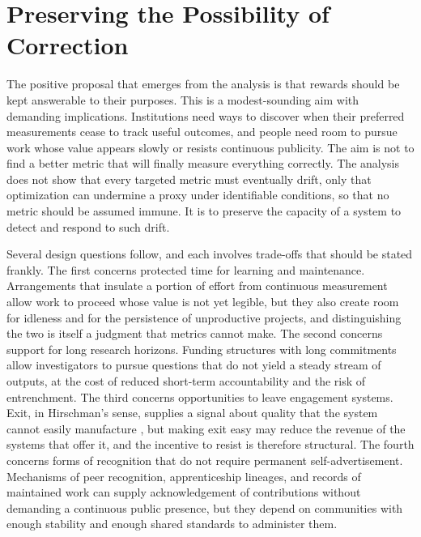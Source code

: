 \documentclass[11pt]{article}
\theoremstyle{definition}
\theoremstyle{remark}
\begin{document}
\section{Preserving the Possibility of Correction}

The positive proposal that emerges from the analysis is that rewards should be kept answerable to their purposes. This is a modest-sounding aim with demanding implications. Institutions need ways to discover when their preferred measurements cease to track useful outcomes, and people need room to pursue work whose value appears slowly or resists continuous publicity. The aim is not to find a better metric that will finally measure everything correctly. The analysis does not show that every targeted metric must eventually drift, only that optimization can undermine a proxy under identifiable conditions, so that no metric should be assumed immune. It is to preserve the capacity of a system to detect and respond to such drift.

Several design questions follow, and each involves trade-offs that should be stated frankly. The first concerns protected time for learning and maintenance. Arrangements that insulate a portion of effort from continuous measurement allow work to proceed whose value is not yet legible, but they also create room for idleness and for the persistence of unproductive projects, and distinguishing the two is itself a judgment that metrics cannot make. The second concerns support for long research horizons. Funding structures with long commitments allow investigators to pursue questions that do not yield a steady stream of outputs, at the cost of reduced short-term accountability and the risk of entrenchment. The third concerns opportunities to leave engagement systems. Exit, in Hirschman's sense, supplies a signal about quality that the system cannot easily manufacture \cite{hirschman1970}, but making exit easy may reduce the revenue of the systems that offer it, and the incentive to resist is therefore structural. The fourth concerns forms of recognition that do not require permanent self-advertisement. Mechanisms of peer recognition, apprenticeship lineages, and records of maintained work can supply acknowledgement of contributions without demanding a continuous public presence, but they depend on communities with enough stability and enough shared standards to administer them.
\end{document}
